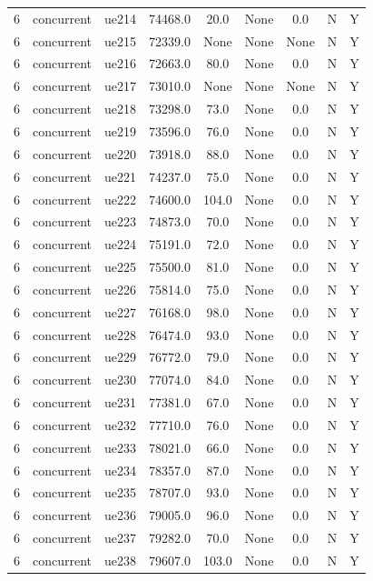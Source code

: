 \begin{table}[ht]
\begin{tabular}{|c|c|c|c|c|c|c|c|c|}
6 & concurrent & ue214 & 74468.0 & 20.0 & None & 0.0 & N & Y \\
6 & concurrent & ue215 & 72339.0 & None & None & None & N & Y \\
6 & concurrent & ue216 & 72663.0 & 80.0 & None & 0.0 & N & Y \\
6 & concurrent & ue217 & 73010.0 & None & None & None & N & Y \\
6 & concurrent & ue218 & 73298.0 & 73.0 & None & 0.0 & N & Y \\
6 & concurrent & ue219 & 73596.0 & 76.0 & None & 0.0 & N & Y \\
6 & concurrent & ue220 & 73918.0 & 88.0 & None & 0.0 & N & Y \\
6 & concurrent & ue221 & 74237.0 & 75.0 & None & 0.0 & N & Y \\
6 & concurrent & ue222 & 74600.0 & 104.0 & None & 0.0 & N & Y \\
6 & concurrent & ue223 & 74873.0 & 70.0 & None & 0.0 & N & Y \\
6 & concurrent & ue224 & 75191.0 & 72.0 & None & 0.0 & N & Y \\
6 & concurrent & ue225 & 75500.0 & 81.0 & None & 0.0 & N & Y \\
6 & concurrent & ue226 & 75814.0 & 75.0 & None & 0.0 & N & Y \\
6 & concurrent & ue227 & 76168.0 & 98.0 & None & 0.0 & N & Y \\
6 & concurrent & ue228 & 76474.0 & 93.0 & None & 0.0 & N & Y \\
6 & concurrent & ue229 & 76772.0 & 79.0 & None & 0.0 & N & Y \\
6 & concurrent & ue230 & 77074.0 & 84.0 & None & 0.0 & N & Y \\
6 & concurrent & ue231 & 77381.0 & 67.0 & None & 0.0 & N & Y \\
6 & concurrent & ue232 & 77710.0 & 76.0 & None & 0.0 & N & Y \\
6 & concurrent & ue233 & 78021.0 & 66.0 & None & 0.0 & N & Y \\
6 & concurrent & ue234 & 78357.0 & 87.0 & None & 0.0 & N & Y \\
6 & concurrent & ue235 & 78707.0 & 93.0 & None & 0.0 & N & Y \\
6 & concurrent & ue236 & 79005.0 & 96.0 & None & 0.0 & N & Y \\
6 & concurrent & ue237 & 79282.0 & 70.0 & None & 0.0 & N & Y \\
6 & concurrent & ue238 & 79607.0 & 103.0 & None & 0.0 & N & Y \\

\end{tabular}
\end{table}
